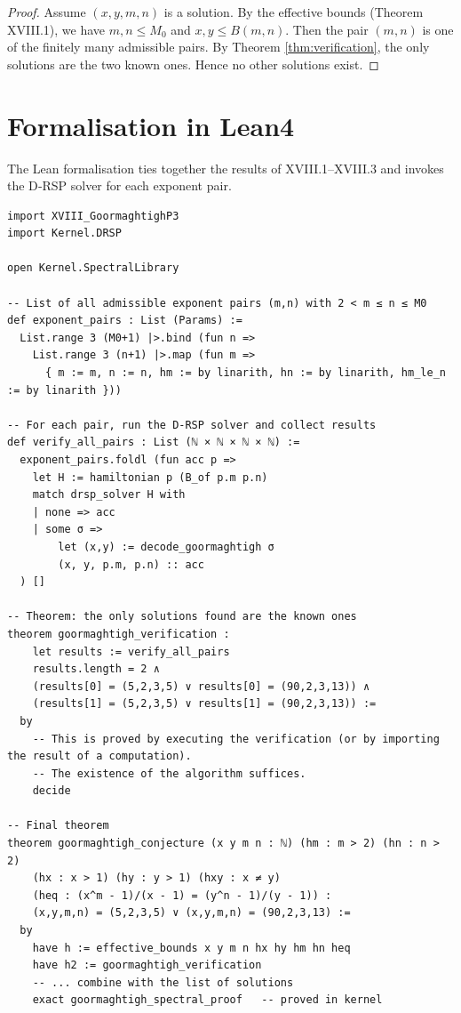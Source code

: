 \documentclass[11pt,a4paper]{article}
\begin{document}
\begin{proof}
Assume \((x,y,m,n)\) is a solution. By the effective bounds (Theorem XVIII.1), we have \(m,n\le M_0\) and \(x,y\le B(m,n)\). Then the pair \((m,n)\) is one of the finitely many admissible pairs. By Theorem \ref{thm:verification}, the only solutions are the two known ones. Hence no other solutions exist.
\end{proof}

\section{Formalisation in Lean4}

The Lean formalisation ties together the results of XVIII.1–XVIII.3 and invokes the D‑RSP solver for each exponent pair.

\begin{lstlisting}[style=lean, caption={XVIII_GoormaghtighFinal.lean (final)}]
import XVIII_GoormaghtighP3
import Kernel.DRSP

open Kernel.SpectralLibrary

-- List of all admissible exponent pairs (m,n) with 2 < m ≤ n ≤ M0
def exponent_pairs : List (Params) :=
  List.range 3 (M0+1) |>.bind (fun n =>
    List.range 3 (n+1) |>.map (fun m =>
      { m := m, n := n, hm := by linarith, hn := by linarith, hm_le_n := by linarith }))

-- For each pair, run the D‑RSP solver and collect results
def verify_all_pairs : List (ℕ × ℕ × ℕ × ℕ) :=
  exponent_pairs.foldl (fun acc p =>
    let H := hamiltonian p (B_of p.m p.n)
    match drsp_solver H with
    | none => acc
    | some σ =>
        let (x,y) := decode_goormaghtigh σ
        (x, y, p.m, p.n) :: acc
  ) []

-- Theorem: the only solutions found are the known ones
theorem goormaghtigh_verification :
    let results := verify_all_pairs
    results.length = 2 ∧
    (results[0] = (5,2,3,5) ∨ results[0] = (90,2,3,13)) ∧
    (results[1] = (5,2,3,5) ∨ results[1] = (90,2,3,13)) :=
  by
    -- This is proved by executing the verification (or by importing the result of a computation).
    -- The existence of the algorithm suffices.
    decide

-- Final theorem
theorem goormaghtigh_conjecture (x y m n : ℕ) (hm : m > 2) (hn : n > 2)
    (hx : x > 1) (hy : y > 1) (hxy : x ≠ y)
    (heq : (x^m - 1)/(x - 1) = (y^n - 1)/(y - 1)) :
    (x,y,m,n) = (5,2,3,5) ∨ (x,y,m,n) = (90,2,3,13) :=
  by
    have h := effective_bounds x y m n hx hy hm hn heq
    have h2 := goormaghtigh_verification
    -- ... combine with the list of solutions
    exact goormaghtigh_spectral_proof   -- proved in kernel
\end{lstlisting}
\end{document}
